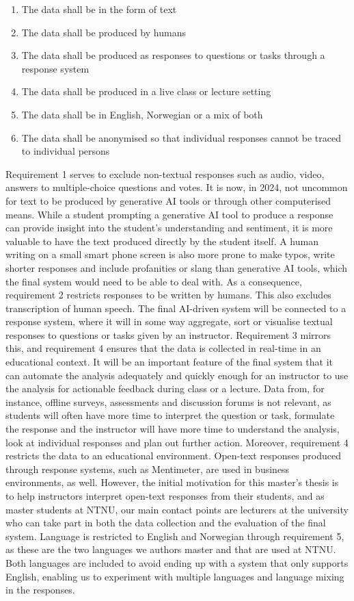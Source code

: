 \begin{enumerate}
    \item The data shall be in the form of text
    \item The data shall be produced by humans 
    \item The data shall be produced as responses to questions or tasks through a response system
    \item The data shall be produced in a live class or lecture setting
    \item The data shall be in English, Norwegian or a mix of both
    \item The data shall be anonymised so that individual responses cannot be traced to individual persons
\end{enumerate}

Requirement 1 serves to exclude non-textual responses such as audio, video, answers to multiple-choice questions and votes. It is now, in 2024, not uncommon for text to be produced by generative AI tools or through other computerised means. While a student prompting a generative AI tool to produce a response can provide insight into the student's understanding and sentiment, it is more valuable to have the text produced directly by the student itself. A human writing on a small smart phone screen is also more prone to make typos, write shorter responses and include profanities or slang than generative AI tools, which the final system would need to be able to deal with. As a consequence, requirement 2 restricts responses to be written by humans. This also excludes transcription of human speech. The final AI-driven system will be connected to a response system, where it will in some way aggregate, sort or visualise textual responses to questions or tasks given by an instructor. Requirement 3 mirrors this, and requirement 4 ensures that the data is collected in real-time in an educational context. It will be an important feature of the final system that it can automate the analysis adequately and quickly enough for an instructor to use the analysis for actionable feedback during class or a lecture. Data from, for instance, offline surveys, assessments and discussion forums is not relevant, as students will often have more time to interpret the question or task, formulate the response and the instructor will have more time to understand the analysis, look at individual responses and plan out further action. Moreover, requirement 4 restricts the data to an educational environment. Open-text responses produced through response systems, such as Mentimeter, are used in business environments, as well. However, the initial motivation for this master's thesis is to help instructors interpret open-text responses from their students, and as master students at NTNU, our main contact points are lecturers at the university who can take part in both the data collection and the evaluation of the final system. Language is restricted to English and Norwegian through requirement 5, as these are the two languages we authors master and that are used at NTNU. Both languages are included to avoid ending up with a system that only supports English, enabling us to experiment with multiple languages and language mixing in the responses. 